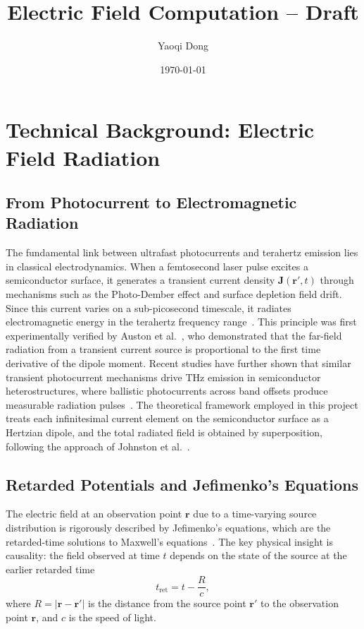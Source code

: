 \documentclass[12pt]{interim_report}
\title{Electric Field Computation -- Draft}
\author{Yaoqi Dong}
\date{\today}
\begin{document}
\maketitle

\section{Technical Background: Electric Field Radiation}

\subsection{From Photocurrent to Electromagnetic Radiation}
The fundamental link between ultrafast photocurrents and terahertz emission lies in classical electrodynamics. When a femtosecond laser pulse excites a semiconductor surface, it generates a transient current density $\mathbf{J}(\mathbf{r}', t)$ through mechanisms such as the Photo-Dember effect and surface depletion field drift. Since this current varies on a sub-picosecond timescale, it radiates electromagnetic energy in the terahertz frequency range~\cite{Yang2023}. This principle was first experimentally verified by Auston et al.~\cite{auston_picosecond_1984}, who demonstrated that the far-field radiation from a transient current source is proportional to the first time derivative of the dipole moment. Recent studies have further shown that similar transient photocurrent mechanisms drive THz emission in semiconductor heterostructures, where ballistic photocurrents across band offsets produce measurable radiation pulses~\cite{Malevich2021}. The theoretical framework employed in this project treats each infinitesimal current element on the semiconductor surface as a Hertzian dipole, and the total radiated field is obtained by superposition, following the approach of Johnston et al.~\cite{SimulationTHz}.

\subsection{Retarded Potentials and Jefimenko's Equations}
The electric field at an observation point $\mathbf{r}$ due to a time-varying source distribution is rigorously described by Jefimenko's equations, which are the retarded-time solutions to Maxwell's equations~\cite{griffiths_electrodynamics}. The key physical insight is causality: the field observed at time $t$ depends on the state of the source at the earlier retarded time
\begin{equation}
    t_{\mathrm{ret}} = t - \frac{R}{c},
\end{equation}
where $R = |\mathbf{r} - \mathbf{r}'|$ is the distance from the source point $\mathbf{r}'$ to the observation point $\mathbf{r}$, and $c$ is the speed of light.
\end{document}
